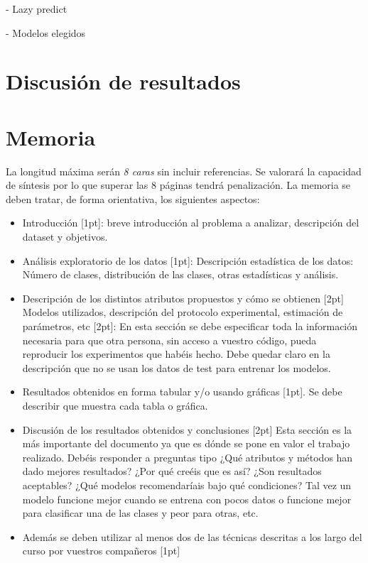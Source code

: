 \documentclass{esannV2}
\begin{document}
- Lazy predict

- Modelos elegidos

\section{Discusión de resultados}



\section{Memoria}
La longitud máxima serán \emph{8 caras} sin incluir referencias. Se valorará la
capacidad de síntesis por lo que superar las 8 páginas tendrá penalización. La
memoria se deben tratar, de forma orientativa, los siguientes aspectos:

\begin{itemize}
\item Introducción [1pt]: breve introducción al problema a analizar, descripción del dataset y objetivos.
\item Análisis exploratorio de los datos [1pt]: Descripción estadística de los datos: Número de clases, distribución de las clases, otras estadísticas y análisis.
\item Descripción de los distintos atributos  propuestos y cómo se obtienen [2pt]
Modelos utilizados, descripción del protocolo experimental, estimación de parámetros, etc [2pt]: En esta sección se debe especificar toda la información necesaria para que otra persona, sin acceso a vuestro código, pueda reproducir los experimentos que habéis hecho. Debe quedar claro en la descripción que no se usan los datos de test para entrenar los modelos.
\item Resultados obtenidos en forma tabular y/o usando gráficas [1pt]. Se debe describir que muestra cada tabla o gráfica.
\item Discusión de los resultados obtenidos y conclusiones [2pt] Esta sección es la más importante del documento ya que es dónde se pone en valor el trabajo realizado. Debéis responder a preguntas  tipo ¿Qué atributos y métodos han dado mejores resultados? ¿Por qué creéis que es así? ¿Son resultados aceptables? ¿Qué modelos recomendaríais bajo qué condiciones? Tal vez un modelo funcione mejor cuando se entrena con pocos datos o funcione mejor para clasificar una de las clases y peor para otras, etc.
\item Además se deben utilizar al menos dos de las técnicas descritas a los largo del curso por vuestros compañeros [1pt]
\end{itemize}
\end{document}
